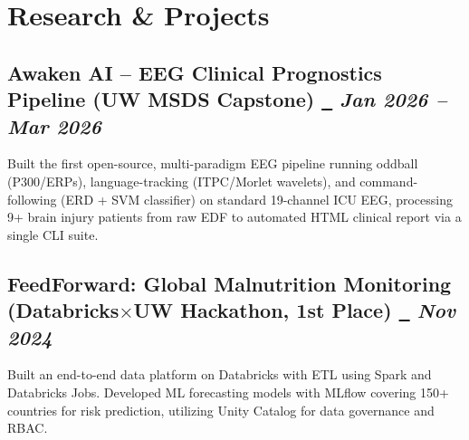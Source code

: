\documentclass[10pt,a4paper]{article}
\begin{document}
\section*{Research \& Projects}

\subsection{Awaken AI -- EEG Clinical Prognostics Pipeline (UW MSDS Capstone)%
\href{https://github.com/ayushmall0710/awaken-ai}{~\faExternalLink*} \hfill \textit{Jan 2026 -- Mar 2026}}
Built the first open-source, multi-paradigm EEG pipeline running oddball (P300/ERPs), language-tracking (ITPC/Morlet wavelets), and command-following (ERD + SVM classifier) on standard 19-channel ICU EEG, processing 9+ brain injury patients from raw EDF to automated HTML clinical report via a single CLI suite.


\subsection{FeedForward: Global Malnutrition Monitoring (Databricks$\times$UW Hackathon, 1st Place)%
\href{https://github.com/ayushmall0710/databricks-hackathon}{~\faExternalLink*} \hfill \textit{Nov 2024}}
Built an end-to-end data platform on Databricks with ETL using Spark and Databricks Jobs. Developed ML forecasting models with MLflow covering 150+ countries for risk prediction, utilizing Unity Catalog for data governance and RBAC.

\end{document}
